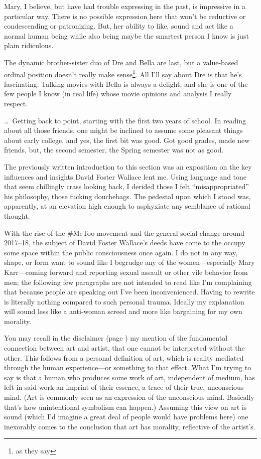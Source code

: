 \documentclass[./butidigress.tex]{subfiles}
\begin{document}
Mary, I believe, but have had trouble expressing in the past, is impressive in a particular way.
There is no possible expression here that won't be reductive or condescending or patronizing.
But, her ability to like, sound and act like a normal human being while also being maybe the smartest person I know is just plain ridiculous.

The dynamic brother-sister duo of Dre and Bella are last, but a value-based ordinal position doesn't really make sense\footnote{as they say}.
All I'll say about Dre is that he's fascinating.
Talking movies with Bella is always a delight, and she is one of the few people I know (in real life) whose movie opinions and analysis I really respect.

\vspace*{3\parskip}

\ldots\ Getting back to point, starting with the first two years of school.
In reading about all those friends, one might be inclined to assume some pleasant things about early college, and yes, the first bit was good.
Got good grades, made new friends, but, the second semester, the Spring semester was not as good.

\label{sec:influences}
The previously written introduction to this section was an exposition on the key influences and insights David Foster Wallace lent me.
Using language and tone that seem chillingly crass looking back, I derided those I felt ``misappropriated'' his philosophy, those fucking douchebags.
The pedestal upon which I stood was, apparently, at an elevation high enough to asphyxiate any semblance of rational thought.

With the rise of the \#MeToo movement and the general social change around 2017--18, the subject of David Foster Wallace's deeds have come to the occupy some space within the public consciousness once again.
I do not in any way, shape, or form want to sound like I begrudge any of the women---especially Mary Karr---coming forward and reporting sexual assault or other vile behavior from men; the following few paragraphs are not intended to read like I'm complaining that because people are speaking out I've been inconvenienced.
Having to rewrite is literally nothing compared to such personal trauma.
Ideally my explanation will sound less like a anti-woman screed and more like bargaining for my own morality.

You may recall in the disclaimer (page \pageref{chap:disclaimer}) my mention of the fundamental connection between art and artist, that one cannot be interpreted without the other.
This follows from a personal definition of art, which is reality mediated through the human experience---or something to that effect.
What I'm trying to say is that a human who produces some work of art, independent of medium, has left in said work an imprint of their essence, a trace of their true, unconscious mind.
(Art is commonly seen as an expression of the unconscious mind.
Basically that's how unintentional symbolism can happen.)
Assuming this view on art is sound (which I'd imagine a great deal of people would have problems here) one inexorably comes to the conclusion that art has morality, reflective of the artist's.
\end{document}
